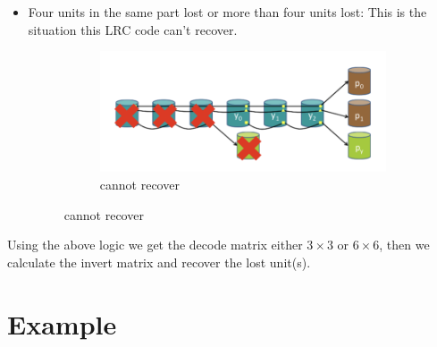 \documentclass[10pt]{article}
\begin{document}
\begin{itemize}
\begin{itemize}
\item Four units in the same part lost or more than four units lost: This is the situation this LRC code can't recover.
\begin{figure}[H]
\centering
\begin{subfigure}[b]{0.5\textwidth}
        \includegraphics[width=\textwidth]{LRC-5.png}
        \caption{cannot recover}
\end{subfigure}
\end{figure}
\end{itemize}
\end{itemize}

Using the above logic we get the decode matrix either $3 \times 3$ or $6\times 6$, then we calculate the invert matrix and recover the lost unit(s).



\section{Example}




\end{document}
